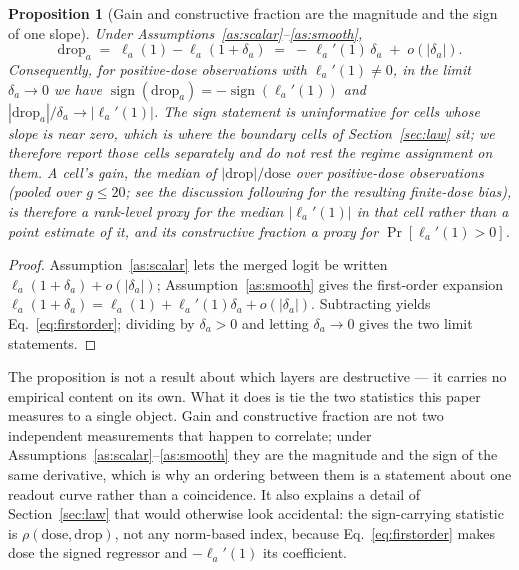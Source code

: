 \documentclass[preprint,12pt]{elsarticle}
\newtheorem{proposition}{Proposition}
\theoremstyle{definition}
\begin{document}
\begin{proposition}[Gain and constructive fraction are the magnitude and the sign of one
slope]\label{prop:slope}
Under Assumptions~\ref{as:scalar}--\ref{as:smooth},
\begin{equation}
\mathrm{drop}_a\;=\;\ell_a(1)-\ell_a(1+\delta_a)\;=\;-\,\ell_a'(1)\,\delta_a\;+\;o(|\delta_a|).
\label{eq:firstorder}
\end{equation}
Consequently, for positive-dose observations with $\ell_a'(1)\neq0$, in the limit
$\delta_a\to0$ we have $\operatorname{sign}(\mathrm{drop}_a)=
-\operatorname{sign}(\ell_a'(1))$ and $|\mathrm{drop}_a|/\delta_a\to|\ell_a'(1)|$.
The sign statement is uninformative for cells whose slope is near zero, which is
where the boundary cells of Section~\ref{sec:law} sit; we therefore report those
cells separately and do not rest the regime assignment on them. A
cell's \emph{gain}, the median of $|\mathrm{drop}|/\mathrm{dose}$ over positive-dose
observations (pooled over $g\leq20$; see the discussion following for the
resulting finite-dose bias), is therefore a rank-level proxy for the median
$|\ell_a'(1)|$ in that cell rather than a point estimate of it, and its
\emph{constructive fraction} a proxy for $\Pr[\ell_a'(1)>0]$.
\end{proposition}
\begin{proof}
Assumption~\ref{as:scalar} lets the merged logit be written $\ell_a(1+\delta_a)+
o(|\delta_a|)$; Assumption~\ref{as:smooth} gives the first-order expansion
$\ell_a(1+\delta_a)=\ell_a(1)+\ell_a'(1)\delta_a+o(|\delta_a|)$. Subtracting yields
Eq.~\ref{eq:firstorder}; dividing by $\delta_a>0$ and letting $\delta_a\to0$ gives the
two limit statements.
\end{proof}

The proposition is not a result about which layers are destructive --- it carries no
empirical content on its own. What it does is tie the two statistics this paper measures
to a single object. Gain and constructive fraction are not two independent measurements
that happen to correlate; under Assumptions~\ref{as:scalar}--\ref{as:smooth} they are the
magnitude and the sign of the same derivative, which is why an ordering between them is
a statement about one readout curve rather than a coincidence. It also explains a
detail of Section~\ref{sec:law} that would otherwise look accidental: the
sign-carrying statistic is $\rho(\mathrm{dose},\mathrm{drop})$, not any norm-based
index, because Eq.~\ref{eq:firstorder} makes dose the signed regressor and $-\ell_a'(1)$
its coefficient.
\end{document}
